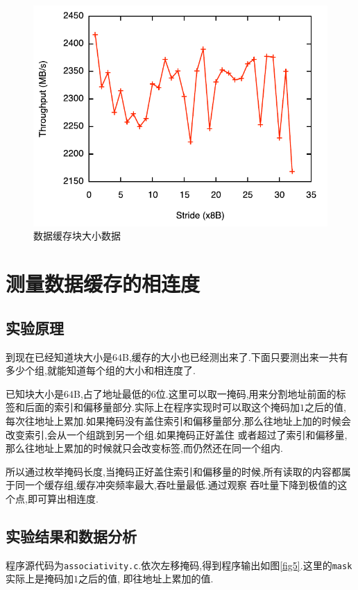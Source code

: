 \documentclass[adobefonts, nocap]{ctexart}
\begin{document}
      \begin{figure}[htbp]
        \includegraphics[width=12cm]{4.pdf}
        \caption{数据缓存块大小数据}
        \label{fig4}
      \end{figure}
      \clearpage
  \section{测量数据缓存的相连度}
    \subsection{实验原理}
      到现在已经知道块大小是$64$B,缓存的大小也已经测出来了.下面只要测出来一共有多少个组,就能知道每个组的大小和相连度了.

      已知块大小是$64$B,占了地址最低的$6$位.这里可以取一掩码,用来分割地址前面的标签和后面的索引和偏移量部分.实际上在程序实现时可以取这个掩码加$1$之后的值,
      每次往地址上累加.如果掩码没有盖住索引和偏移量部分,那么往地址上加的时候会改变索引,会从一个组跳到另一个组.如果掩码正好盖住
      或者超过了索引和偏移量,那么往地址上累加的时候就只会改变标签,而仍然还在同一个组内.

      所以通过枚举掩码长度,当掩码正好盖住索引和偏移量的时候,所有读取的内容都属于同一个缓存组,缓存冲突频率最大,吞吐量最低.通过观察
      吞吐量下降到极值的这个点,即可算出相连度.
    \subsection{实验结果和数据分析}
      程序源代码为\texttt{associativity.c}.依次左移掩码,得到程序输出如图\ref{fig5}.这里的\texttt{mask}实际上是掩码加$1$之后的值,
      即往地址上累加的值.
\end{document}
